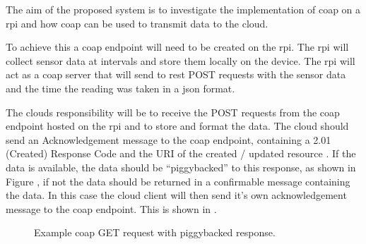 The aim of the proposed system is to investigate the implementation of \gls{coap} 
on a \gls{rpi} and how \gls{coap} can be used to transmit data to the cloud. 

To achieve this a \gls{coap} endpoint will need to be created on the \gls{rpi}. 
The \gls{rpi} will collect sensor data at intervals and store them 
locally on the device. The \gls{rpi} will act as a \gls{coap} server that will 
send to \gls{rest} POST requests with the sensor data and the time
the reading was taken in a \gls{json} format.

The clouds responsibility will be to receive the POST requests from the \gls{coap} 
endpoint hosted on the \gls{rpi} and to store and format the data. 
The cloud should send an Acknowledgement message to the \gls{coap} endpoint, 
containing a 2.01 (Created) Response Code and the URI of the created / updated 
resource \citep{shelby_constrained_2014}. 
If the data is available, the data should be ``piggybacked'' to this response, as 
shown in Figure , if not the data should be 
returned in a confirmable message containing the data.
 In this case the cloud client will then send it's own acknowledgement message to 
 the \gls{coap} endpoint. This is shown in  .

\begin{figure}[H]
    \centering
    \caption{\label{fig:coap_get_piggy} Example \gls{coap} GET request with piggybacked response. \citep{shelby_constrained_2014}}
\end{figure}

